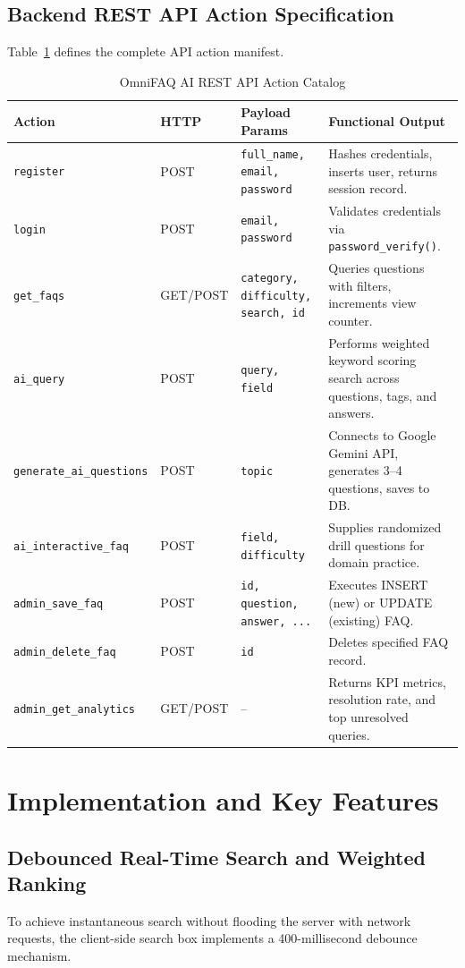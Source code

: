 \documentclass[12pt,a4paper]{report}
\begin{document}
\section{Backend REST API Action Specification}
Table~\ref{tab:api_endpoints} defines the complete API action manifest.

\begin{table}[h!]
\centering
\caption{OmniFAQ AI REST API Action Catalog}
\label{tab:api_endpoints}
\begin{tabularx}{\textwidth}{lp{2cm}p{3cm}X}
\toprule
\textbf{Action} & \textbf{HTTP} & \textbf{Payload Params} & \textbf{Functional Output} \\
\midrule
\texttt{register} & POST & \texttt{full\_name, email, password} & Hashes credentials, inserts user, returns session record. \\
\texttt{login} & POST & \texttt{email, password} & Validates credentials via \texttt{password\_verify()}. \\
\texttt{get\_faqs} & GET/POST & \texttt{category, difficulty, search, id} & Queries questions with filters, increments view counter. \\
\texttt{ai\_query} & POST & \texttt{query, field} & Performs weighted keyword scoring search across questions, tags, and answers. \\
\texttt{generate\_ai\_questions} & POST & \texttt{topic} & Connects to Google Gemini API, generates 3--4 questions, saves to DB. \\
\texttt{ai\_interactive\_faq} & POST & \texttt{field, difficulty} & Supplies randomized drill questions for domain practice. \\
\texttt{admin\_save\_faq} & POST & \texttt{id, question, answer, ...} & Executes INSERT (new) or UPDATE (existing) FAQ. \\
\texttt{admin\_delete\_faq} & POST & \texttt{id} & Deletes specified FAQ record. \\
\texttt{admin\_get\_analytics}& GET/POST & -- & Returns KPI metrics, resolution rate, and top unresolved queries. \\
\bottomrule
\end{tabularx}
\end{table}

\chapter{Implementation and Key Features}
\label{chap:impl}

\section{Debounced Real-Time Search and Weighted Ranking}
To achieve instantaneous search without flooding the server with network requests, the client-side search box implements a 400-millisecond debounce mechanism.
\end{document}
